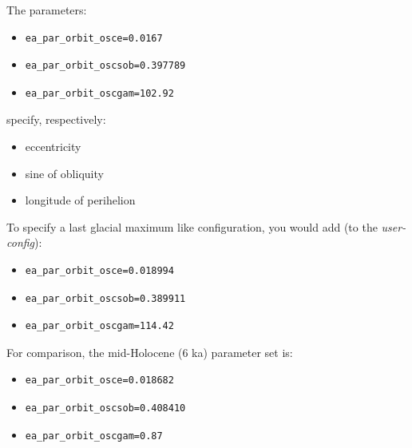 \documentclass[11pt,fleqn]{book} %
\begin{document}
\noindent The parameters:
\begin{itemize}[noitemsep]
\setlength{\itemindent}{.2in}
\item \small\begin{verbatim}
ea_par_orbit_osce=0.0167
\end{verbatim}\normalsize
\item \small\begin{verbatim}
ea_par_orbit_oscsob=0.397789
\end{verbatim}\normalsize
\item \small\begin{verbatim}
ea_par_orbit_oscgam=102.92
\end{verbatim}\normalsize
\end{itemize}
specify, respectively:
\begin{itemize}[noitemsep]
\setlength{\itemindent}{.2in}
\item eccentricity
\item sine of obliquity
\item longitude of perihelion
\end{itemize}

\noindent To specify a last glacial maximum like configuration, you would add (to the \textit{user-config}):
\begin{itemize}[noitemsep]
\setlength{\itemindent}{.2in}
\item \small\begin{verbatim}
ea_par_orbit_osce=0.018994
\end{verbatim}\normalsize
\item \small\begin{verbatim}
ea_par_orbit_oscsob=0.389911
\end{verbatim}\normalsize
\item \small\begin{verbatim}
ea_par_orbit_oscgam=114.42 
\end{verbatim}\normalsize
\end{itemize}

\noindent For comparison, the mid-Holocene (6 ka) parameter set is:
\begin{itemize}[noitemsep]
\setlength{\itemindent}{.2in}
\item \small\begin{verbatim}
ea_par_orbit_osce=0.018682
\end{verbatim}\normalsize
\item \small\begin{verbatim}
ea_par_orbit_oscsob=0.408410
\end{verbatim}\normalsize
\item \small\begin{verbatim}
ea_par_orbit_oscgam=0.87
\end{verbatim}\normalsize
\end{itemize}
\end{document}
